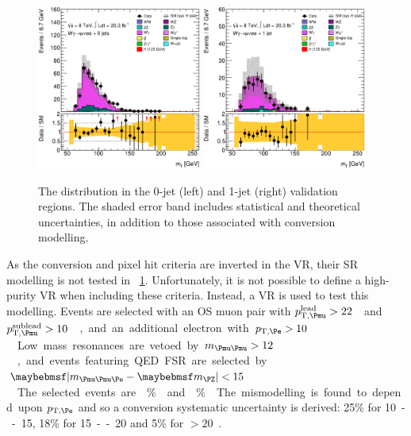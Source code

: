\begin{figure}[t]
	\includegraphics[width=0.48\textwidth]{tex/backgrounds/Wgamma/CutTopoDPhill_0jet_MT_TrackHWW_Clj_mh125_lin}
	\hfill
	\includegraphics[width=0.48\textwidth]{tex/backgrounds/Wgamma/CutTopoDPhill_1jet_MT_TrackHWW_Clj_mh125_lin}
	\caption{The \mt distribution in the 0-jet (left) and 1-jet (right) \Wgamma validation 
	regions. The shaded error band includes statistical and theoretical uncertainties, in 
	addition to those associated with conversion modelling.}
	\label{fig:wgamma:vr}
\end{figure}

As the conversion and pixel hit criteria are inverted in the VR, their SR modelling is not 
tested in \Figure~\ref{fig:wgamma:vr}. Unfortunately, it is not possible to define a 
high-purity \Wgamma VR when including these criteria. Instead, 
a \HepProcess{\Zgamma \HepTo \Pmu\Pmu\Pphoton} VR is used to test this modelling. 
Events are selected with an OS muon pair with \unit{$p_{\text{T,\Pmu}}^{\text{lead}} > 
22$}{\GeV} and \unit{$p_{\text{T,\Pmu}}^{\text{sublead}} > 10$}{\GeV}, and an additional 
electron with \unit{$p_{\text{T,\Pe}} > 10$}{\GeV}. Low mass resonances are vetoed by 
\unit{$m_{\HepProcess{\Pmu\Pmu}} > 12$}{\GeV}, and events featuring QED FSR are selected by 
\unit{$\mods{m_{\HepProcess{\Pmu\Pmu\Pe}} - \mZ} < 15$}{\GeV}. The selected events are 
\% \Zgamma and \% \Zgstar. The mismodelling is found to depend upon 
$p_{\text{T,\Pe}}$ and so a conversion systematic uncertainty is derived: 25\% for 
\unit{10 -- 15}{\GeV}, 18\% for \unit{15 -- 20}{\GeV} and 5\% for \unit{$>\!20$}{\GeV}.



